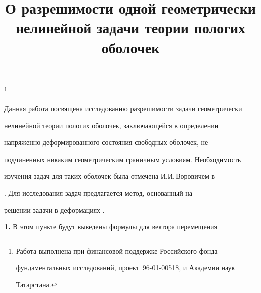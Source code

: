 

\title{О разрешимости одной геометрически\\ 


нелинейной задачи теории пологих оболочек} 


 


\thanks{Работа выполнена при финансовой поддержке Российского фонда 


фундаментальных исследований, проект \No\,96-01-00518, и Академии наук 


Татарстана.} 


\date{} 




 


\pagestyle{plain} %


 


 




 


\maketitle 


\label{begin} 


 


Данная работа посвящена исследованию разрешимости задачи геометрически 


нелинейной теории пологих оболочек, заключающейся в определении 


напряженно-деформированного состояния свободных оболочек, не 


подчиненных никаким геометрическим граничным условиям. Необходимость 


изучения задач для таких оболочек была отмечена И.И.\,Воровичем в 


\cite{1}. Для исследования задач предлагается метод, основанный на 


решении задачи в деформациях \cite{2}. 


\medskip 


 


{\bf 1.} В этом пункте будут выведены формулы для вектора перемещения



